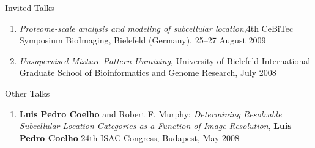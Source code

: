 \documentclass{article}
\renewcommand\subsection[1]{%
    \par\vspace{.1em}%
    {\hspace{1em}\subsubhead #1}%
    \par\vspace{.2em}%
}
\begin{document}
\subsection{Invited Talks}
\begin{enumerate}
\item \emph{Proteome-scale analysis and modeling of subcellular location},4th
CeBiTec Symposium BioImaging, Bielefeld (Germany), 25--27 August 2009
\item \emph{Unsupervised Mixture Pattern Unmixing}, University of Bielefeld
International Graduate School of Bioinformatics and Genome Research, July 2008
\end{enumerate}


\subsection{Other Talks}

\begin{enumerate}
\item \textbf{Luis Pedro Coelho} and Robert F. Murphy; \emph{Determining
Resolvable Subcellular Location Categories as a Function of Image Resolution},
\textbf{Luis Pedro Coelho} 24th ISAC Congress, Budapest, May 2008
\end{enumerate}
\end{document}
